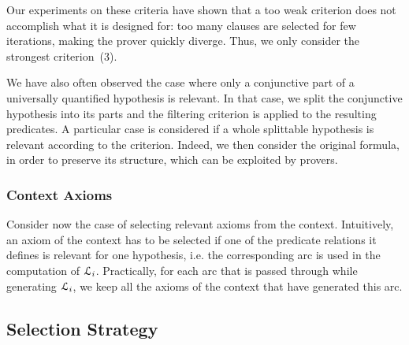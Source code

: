 \documentclass{acm_proc_article-sp}
\theoremstyle{nonumberplain}
\newcommand{\eL}{\EuScript L}
\begin{document}
Our experiments on these criteria have shown that a too weak criterion
does not accomplish what it is designed for: too many clauses  are
selected for few iterations, making the prover quickly diverge. Thus,
we only consider the strongest criterion~(3).

We have also often observed the case where only a conjunctive part of a
universally quantified hypothesis is relevant. In that case, we split
the conjunctive hypothesis into its parts and the filtering criterion
is applied to the resulting predicates. A particular case is considered
if a whole splittable hypothesis is relevant according to the
criterion. Indeed, we then consider the original formula, in order to
preserve its structure, which can be exploited by provers.



\subsubsection{Context Axioms}
Consider now the case of selecting relevant axioms from the context.
Intuitively, an axiom of the context has to be selected if 
one of the predicate relations it defines is relevant for one
hypothesis, i.e. the corresponding arc is used in the computation of $\eL_i$. 
Practically, for each arc that is passed through while generating
$\eL_i$, we keep all the axioms of the context that have generated 
this arc.



\subsection{Selection Strategy}
\label{select:algo:ssec}
\end{document}
